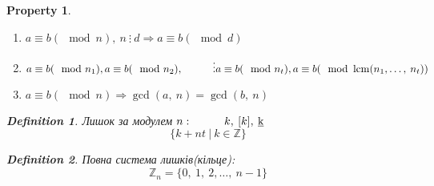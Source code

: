 \documentclass[a4paper,12pt]{bookest}
\newtheorem{definition}{Definition}[section]
\newtheorem*{property*}{Property}
\DeclareMathOperator{\lcm}{lcm}
\newcommand\tab[1][1cm]{\hspace*{#1}}
\begin{document}
\begin{property*}
\begin{enumerate}
\begin{proof}
		\end{proof}
		\item $a\equiv b(\mod n),\>n\>\vdots\>d\Rightarrow a\equiv b(\mod d)$
		\item $a\equiv b(\mod n_1),\\ a\equiv b(\mod n_2),\\\tab\vdots\\a\equiv b(\mod n_t),\\a\equiv b(\mod \lcm(n_1,\dots,\>n_t))$
		\item $a\equiv b(\mod n)\Rightarrow\gcd(a,\>n)=\gcd(b,\>n)$
	\end{enumerate}
	\begin{definition}
		Лишок за модулем $n:\tab k,\>[k],\>\underbar{k}$ $$\{k+nt\>|\>k\in\mathbb{Z}	\}$$
	\end{definition}
	\begin{definition}
		Повна система лишків(кільце):$$ \mathbb{Z}_n=\{0,\>1,\>2,\dots,\>n-1\}$$
	\end{definition}
\end{property*}
\end{document}
